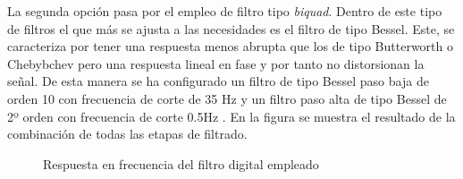 La segunda opción pasa por el empleo de filtro tipo \textit{biquad}. Dentro de este tipo de filtros el que más se ajusta a las necesidades es el filtro de tipo Bessel. Este, se caracteriza por tener una respuesta menos abrupta que los de tipo Butterworth o Chebybchev pero una respuesta lineal en fase y por tanto no distorsionan la señal. De esta manera se ha configurado un filtro de tipo Bessel paso baja de orden 10 con frecuencia de corte de 35 Hz y un filtro paso alta de tipo Bessel de 2º orden con frecuencia de corte 0.5Hz . En la figura se muestra el resultado de la combinación de todas las etapas de filtrado.

\begin{figure}[!ht]
	\center
	
	\caption{Respuesta en frecuencia del filtro digital empleado}
	\label{fig:dig_filt}
\end{figure}

